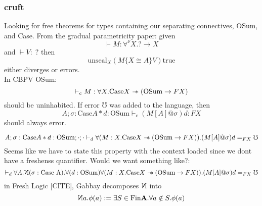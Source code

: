 \documentclass{article}
\begin{document}
\subsubsection{cruft}
Looking for free theorems for types containing our separating connectives, OSum, and Case.
From the gradual parametricity paper: given
\[
    \vdash M : \forall ^{\nu} X . ? \rightarrow X 
\]
and $\vdash V :\; ?$ then
\[
  \textrm{unseal}_X (M \{X \cong A \} V) \textrm{true}  
\]
either diverges or errors. 
\\
In CBPV OSum:
\[
  \vdash_c M : \forall X . \textrm{Case} X \mathrel{-\mkern-6mu*} (\textrm{OSum} \rightarrow F X)  
\]
should be uninhabited. If error $\mho$ was added to the language,
then 
\[
  A ; \sigma : \textrm{Case} A * d : \textrm{OSum} \vdash_c (M[A]@ \sigma)d : F X 
\]
should always error.

\[
  A ; \sigma : \textrm{Case} A * d : \textrm{OSum} ; \cdot ; \cdot \vdash_d 
  \forall (M : X . \textrm{Case} X \mathrel{-\mkern-6mu*} (\textrm{OSum} \rightarrow F X)).  (M[A]@ \sigma)d =_{F X}  \mho 
\]
Seems like we have to state this property with the context loaded since we dont have a freshenss quantifier.
Would we want something like?:
\[
    \vdash_d \forall A . \fresh (\sigma :\textrm{Case A}).\forall (d : \textrm{OSum})
    \forall (M : X . \textrm{Case} X \sep (\textrm{OSum} \rightarrow F X)). 
    (M[A]@ \sigma)d =_{F X}  \mho 
\]
in Fresh Logic [CITE], Gabbay decomposes $\fresh$ into 
\[
    \fresh a . \phi(a) := \exists S \in \textrm{Fin}\mathbf{A}. \forall a \notin S. \phi(a)    
\]

\begin{comment}
What can we say about:  
\[
    \forall X. \textrm{OSum} \rightarrow (\textrm{Case}X \sep F \;\textrm{OSum})
\]
This should only be able to return the original OSum?
It would need a value of type X in addition to a Case X to construct a new value.
What about getting a value from OSum?
\[
  \textrm{OSum} \rightarrow (\forall X . \textrm{Case} X \sep X)
\]
or
\[
  \forall X . \textrm{OSum} \rightarrow ( \textrm{Case} X \sep X)
\]
This type should be uninhabited since a fresh case cannot be used to get a value of X 
since OSum could not have used that case in an injection.
\blue{Both of the above are not well-formed types since $\forall$ quantifies over value types, missing an $F$ }
What about 

\[
  \forall X . \textrm{Case X} \rightarrow (\textrm{OSum}  \sep F X)  
\]
This can be inhabited.. but there are values of type $X$ which are "inaccessible".
\end{comment}
\end{document}
